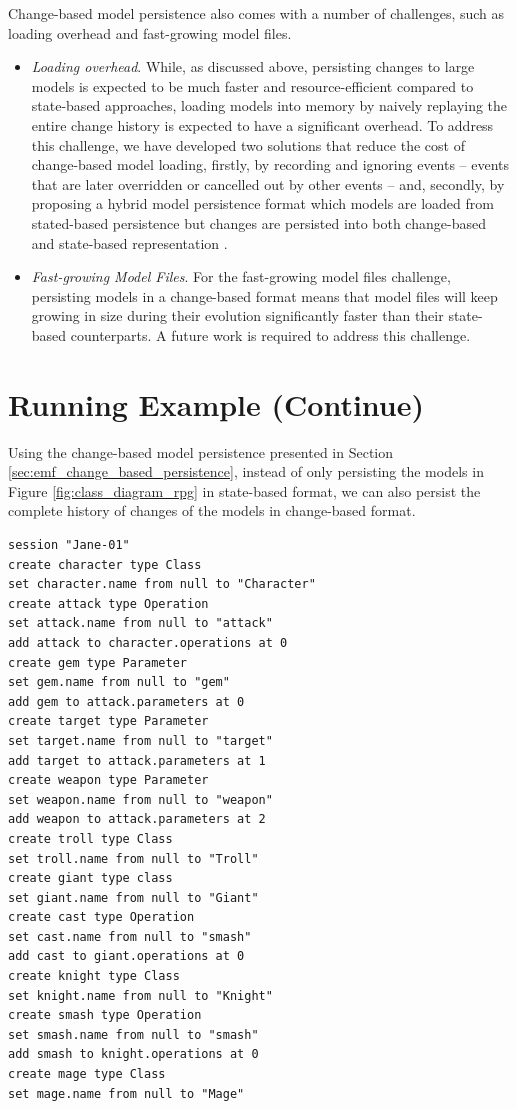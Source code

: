 Change-based model persistence also comes with a number of challenges, such as loading overhead and fast-growing model files. 
\begin{itemize}
\item \emph{Loading overhead}. While, as discussed above, persisting changes to large models is expected to be much faster and resource-efficient compared to state-based approaches, loading models into memory by naively replaying the entire change history is expected to have a significant overhead. To address this challenge, we have developed two solutions that reduce the cost of change-based model loading, firstly, by recording and ignoring events -- events that are later overridden or cancelled out by other events -- \cite{yohannis2018towards} and, secondly, by proposing a hybrid model persistence format which models are loaded from stated-based persistence but changes are persisted into both change-based and state-based representation \cite{DBLP:conf/models/YohannisRPK18}. 
\item \emph{Fast-growing Model Files}. For the fast-growing model files challenge, persisting models in a change-based format means that model files will keep growing in size during their evolution significantly faster than their state-based counterparts. A future work is required to address this challenge.     
\end{itemize}
  
  

\section{Running Example (Continue)}
\label{sec:runnnig_example_continue}
Using the change-based model persistence presented in Section \ref{sec:emf_change_based_persistence}, instead of only persisting the models in Figure \ref{fig:class_diagram_rpg} in state-based format, we can also persist the complete history of changes of the models in change-based format. 

\vspace{-5pt}
\begin{lstlisting}[style=eol,caption={Change-based representation of the original version in Figure \ref{fig:class_diagram_origin}.},label=lst:cbp_origin]
session "Jane-01"
create character type Class
set character.name from null to "Character" 
create attack type Operation
set attack.name from null to "attack" 
add attack to character.operations at 0
create gem type Parameter
set gem.name from null to "gem" 
add gem to attack.parameters at 0
create target type Parameter
set target.name from null to "target" 
add target to attack.parameters at 1
create weapon type Parameter
set weapon.name from null to "weapon" 
add weapon to attack.parameters at 2
create troll type Class
set troll.name from null to "Troll" 
create giant type class
set giant.name from null to "Giant"
create cast type Operation
set cast.name from null to "smash"
add cast to giant.operations at 0
create knight type Class
set knight.name from null to "Knight"
create smash type Operation
set smash.name from null to "smash"
add smash to knight.operations at 0
create mage type Class
set mage.name from null to "Mage" 
\end{lstlisting}

